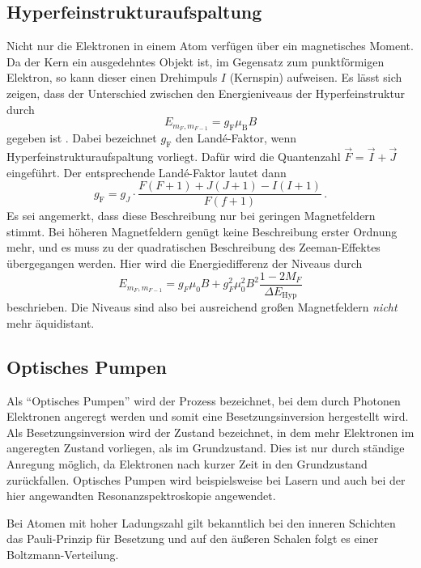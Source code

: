 \subsection{Hyperfeinstrukturaufspaltung}

Nicht nur die Elektronen in einem Atom verfügen über ein magnetisches Moment.
Da der Kern ein ausgedehntes Objekt ist, im Gegensatz zum punktförmigen Elektron, so kann dieser einen Drehimpuls $I$ (Kernspin) aufweisen.
Es lässt sich zeigen, dass der Unterschied zwischen den Energieniveaus der Hyperfeinstruktur durch
\begin{equation}
    E_{m_F,m_{F-1}} = g_\text{F} \mu_\text{B} B
\end{equation}
gegeben ist \cite{demtroeder3}.
Dabei bezeichnet $g_\text{F}$ den Landé-Faktor, wenn Hyperfeinstrukturaufspaltung vorliegt.
Dafür wird die Quantenzahl $\vec{F} = \vec{I} + \vec{J}$ eingeführt.
Der entsprechende Landé-Faktor \cite{optical_pumping} lautet dann
\begin{equation*}
    g_\text{F} = g_J \cdot \frac{F(F+1)+J(J+1)-I(I+1)}{F(f+1)} \, .
\end{equation*}
Es sei angemerkt, dass diese Beschreibung nur bei geringen Magnetfeldern stimmt.
Bei höheren Magnetfeldern genügt keine Beschreibung erster Ordnung mehr, und es muss zu der quadratischen Beschreibung des Zeeman-Effektes übergegangen werden.
Hier wird die Energiedifferenz der Niveaus durch
\begin{equation*}
    E_{m_F,m_{F-1}} = g_F \mu_0 B+g_F^2 \mu_0^2 B^2 \frac{1-2 M_F}{\Delta E_{\mathrm{Hyp}}}
\end{equation*}
beschrieben. Die Niveaus sind also bei ausreichend großen Magnetfeldern \textit{nicht} mehr äquidistant.

\subsection{Optisches Pumpen}

Als \enquote{Optisches Pumpen} wird der Prozess bezeichnet, bei dem durch Photonen Elektronen angeregt werden und somit
eine Besetzungsinversion hergestellt wird.
Als Besetzungsinversion wird der Zustand bezeichnet, in dem mehr Elektronen im angeregten Zustand vorliegen, als im Grundzustand.
Dies ist nur durch ständige Anregung möglich, da Elektronen nach kurzer Zeit in den Grundzustand zurückfallen.
Optisches Pumpen  wird beispielsweise bei Lasern und auch bei der hier angewandten Resonanzspektroskopie angewendet.

Bei Atomen mit hoher Ladungszahl gilt bekanntlich bei den inneren Schichten das Pauli-Prinzip für Besetzung und
auf den äußeren Schalen folgt es einer Boltzmann-Verteilung.

